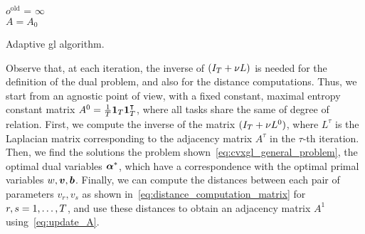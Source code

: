 
\begin{algorithm}[!t]
    \DontPrintSemicolon

    $o^\text{old}$ = $\infty$ \\
    $A = A_0$ 
    \caption{Adaptive \acrshort{gl} algorithm.}
    \label{alg:adapgl}
\end{algorithm}



%
Observe that, at each iteration, the inverse of $(I_T + \nu L)$ is needed for the definition of the dual problem, and also for the distance computations.
Thus, we start from an agnostic point of view, with a fixed constant, maximal entropy constant matrix $A^0 = \frac{1}{T} \bm{1}_T \bm{1}_T^\intercal$, where all tasks share the same of degree of relation.
First, we compute the inverse of the matrix $(I_T + \nu L^0)$, where $L^\tau$ is the Laplacian matrix corresponding to the adjacency matrix $A^\tau$ in the $\tau$-th iteration.
Then, we find the solutions the problem shown~\eqref{eq:cvxgl_general_problem}, the optimal dual variables $\bm{\alpha}^*$, which have a correspondence with the optimal primal variables $w, \bm{v}, \bm{b}$.
Finally, we can compute the distances between each pair of parameters $v_r, v_s$ as shown in~\eqref{eq:distance_computation_matrix} for $r, s=1, \ldots, T$, and use these distances to obtain an adjacency matrix $A^1$ using~\eqref{eq:update_A}.

